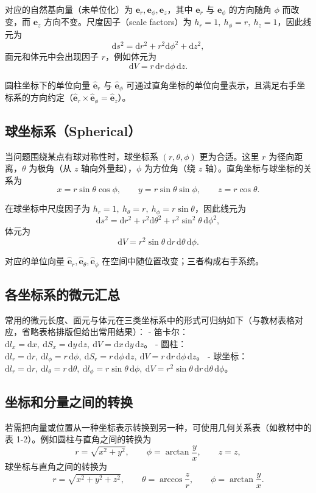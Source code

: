 对应的自然基向量（未单位化）为 $\mathbf{e}_r,\mathbf{e}_\phi,\mathbf{e}_z$，其中 $\mathbf{e}_r$ 与 $\mathbf{e}_\phi$ 的方向随角 $\phi$ 而改变，而 $\mathbf{e}_z$ 方向不变。尺度因子（scale factors）为 $h_r=1,\ h_\phi=r,\ h_z=1$，因此线元为
\[
\mathrm{d}s^2=\mathrm{d}r^2+r^2\mathrm{d}\phi^2+\mathrm{d}z^2,
\]
面元和体元中会出现因子 $r$，例如体元为
\[
\mathrm{d}V=r\,\mathrm{d}r\,\mathrm{d}\phi\,\mathrm{d}z.
\]

圆柱坐标下的单位向量 $\hat{\mathbf{e}}_r$ 与 $\hat{\mathbf{e}}_\phi$ 可通过直角坐标的单位向量表示，且满足右手坐标系的方向约定（$\hat{\mathbf{e}}_r\times\hat{\mathbf{e}}_\phi=\hat{\mathbf{e}}_z$）。

\subsection{球坐标系（Spherical）}
当问题围绕某点有球对称性时，球坐标系 $(r,\theta,\phi)$ 更为合适。这里 $r$ 为径向距离，$\theta$ 为极角（从 $z$ 轴向外量起），$\phi$ 为方位角（绕 $z$ 轴）。直角坐标与球坐标的关系为
\[
x=r\sin\theta\cos\phi,\qquad y=r\sin\theta\sin\phi,\qquad z=r\cos\theta.
\]

在球坐标中尺度因子为 $h_r=1,\ h_\theta=r,\ h_\phi=r\sin\theta$，因此线元为
\[
\mathrm{d}s^2=\mathrm{d}r^2+r^2\mathrm{d}\theta^2+r^2\sin^2\theta\,\mathrm{d}\phi^2,
\]
体元为
\[
\mathrm{d}V=r^2\sin\theta\,\mathrm{d}r\,\mathrm{d}\theta\,\mathrm{d}\phi.
\]

对应的单位向量 $\hat{\mathbf{e}}_r,\hat{\mathbf{e}}_\theta,\hat{\mathbf{e}}_\phi$ 在空间中随位置改变；三者构成右手系统。

\subsection{各坐标系的微元汇总}
常用的微元长度、面元与体元在三类坐标系中的形式可归纳如下（与教材表格对应，省略表格排版但给出常用结果）：
- 笛卡尔：$\mathrm{d}l_x=\mathrm{d}x,\ \mathrm{d}S_x=\mathrm{d}y\,\mathrm{d}z,\ \mathrm{d}V=\mathrm{d}x\,\mathrm{d}y\,\mathrm{d}z$。
- 圆柱：$\mathrm{d}l_r=\mathrm{d}r,\ \mathrm{d}l_\phi=r\,\mathrm{d}\phi,\ \mathrm{d}S_r=r\,\mathrm{d}\phi\,\mathrm{d}z,\ \mathrm{d}V=r\,\mathrm{d}r\,\mathrm{d}\phi\,\mathrm{d}z$。
- 球坐标：$\mathrm{d}l_r=\mathrm{d}r,\ \mathrm{d}l_\theta=r\,\mathrm{d}\theta,\ \mathrm{d}l_\phi=r\sin\theta\,\mathrm{d}\phi,\ \mathrm{d}V=r^2\sin\theta\,\mathrm{d}r\,\mathrm{d}\theta\,\mathrm{d}\phi$。

\subsection{坐标和分量之间的转换}
若需把向量或位置从一种坐标表示转换到另一种，可使用几何关系表（如教材中的表 1-2）。例如圆柱与直角之间的转换为
\[
r=\sqrt{x^2+y^2},\qquad \phi=\arctan\frac{y}{x},\qquad z=z,
\]
球坐标与直角之间的转换为
\[
r=\sqrt{x^2+y^2+z^2},\qquad \theta=\arccos\frac{z}{r},\qquad \phi=\arctan\frac{y}{x}.
\]

